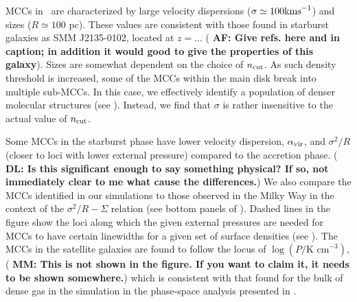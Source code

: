 \IfFileExists{emulateapjlegacy.cls}{\documentclass[iop]{emulateapjlegacy}}{\documentclass[iop]{emulateapj}}
\newcommand{\DL}[1]{({\bf \color{dlcolor} DL: #1})}
\newcommand{\AF}[1]{({\bf \color{afcolor} AF: #1})}
\newcommand{\MM}[1]{({\bf \color{mmcolor} MM: #1})}
\begin{document}
MCCs in \flower\ are characterized by large velocity dispersions ($\sigma \simeq 100 {\rm km s}^{-1}$) and sizes ($R\simeq 100$ pc). These values are consistent with those found in starburst galaxies as SMM J2135-0102, located at $z=...$ \AF{Give refs. here and in caption; in addition it would good to give the properties of this galaxy}.
Sizes are somewhat dependent on the choice of $n_{\rm cut}$. As such density threshold is increased, some of the MCCs within the main disk break into multiple sub-MCCs. In this case, we effectively identify a population of denser molecular structures (see ). Instead, we find that $\sigma$ is rather insensitive to the actual value of $n_{\rm cut}$. 



Some MCCs in the starburst phase have lower velocity dispersion, $\alpha_{\rm vir}$, and $\sigma^2/R$ (closer to loci with lower external pressure) compared to the accretion phase. \DL{Is this significant enough to say something physical? If so, not immediately clear to me what cause the differences.}
We also compare the MCCs identified in our simulations to those observed in the Milky Way in the context of the $\sigma^2/R - \Sigma$ relation (see bottom panels of ). Dashed lines in the figure show the loci along which the given external pressures are needed for MCCs to have certain linewidths for a given set of surface densities (see ).
The MCCs in the satellite galaxies are found to follow the locus of
$\log{(P/\textrm{K cm}^{-3})}$, \MM{This is not shown in the
  figure.  If you want to claim it, it needs to be shown somewhere.} which
is consistent with that found for the bulk of dense gas in the simulation in the phase-space analysis presented in \citet{Pallottini17a}.
\end{document}

